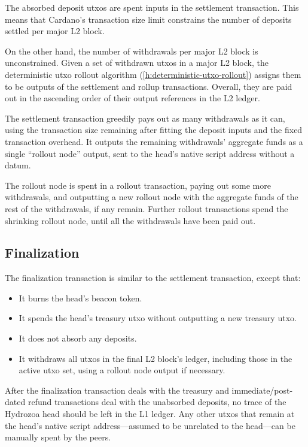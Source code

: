 \documentclass[../hydrozoa.tex]{subfiles}
\begin{document}
The absorbed deposit utxos are spent inputs in the settlement transaction.
This means that Cardano's transaction size limit constrains the number of deposits settled per major L2 block.

On the other hand, the number of withdrawals per major L2 block is unconstrained.
Given a set of withdrawn utxos in a major L2 block, the deterministic utxo rollout algorithm (\cref{h:deterministic-utxo-rollout}) assigns them to be outputs of the settlement and rollup transactions.
Overall, they are paid out in the ascending order of their output references in the L2 ledger.

The settlement transaction greedily pays out as many withdrawals as it can, using the transaction size remaining after fitting the deposit inputs and the fixed transaction overhead.
It outputs the remaining withdrawals' aggregate funds as a single ``rollout node'' output, sent to the head's native script address without a datum.

The rollout node is spent in a rollout transaction, paying out some more withdrawals, and outputting a new rollout node with the aggregate funds of the rest of the withdrawals, if any remain.
Further rollout transactions spend the shrinking rollout node, until all the withdrawals have been paid out.

\subsection{Finalization}%
\label{h:multisig-finalize}
The finalization transaction is similar to the settlement transaction, except that:
\begin{itemize}
  \item It burns the head's beacon token.
  \item It spends the head's treasury utxo without outputting a new treasury utxo.
  \item It does not absorb any deposits.
  \item It withdraws all utxos in the final L2 block's ledger, including those in the active utxo set, using a rollout node output if necessary.
\end{itemize}

After the finalization transaction deals with the treasury and immediate/post-dated refund transactions deal with the unabsorbed deposits, no trace of the Hydrozoa head should be left in the L1 ledger.
Any other utxos that remain at the head's native script address---assumed to be unrelated to the head---can be manually spent by the peers.
\end{document}
